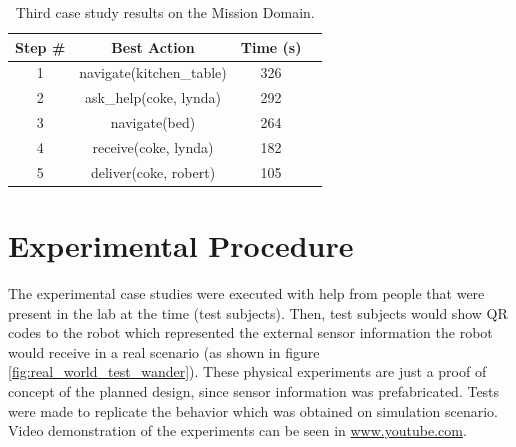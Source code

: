 \begin{table}[H]
\centering
\begin{tabular}{ |c|c|c|c| }
 \hline
Step \# & Best Action                                          &  Time (s) \\
 \hline
1       & navigate(kitchen\_table)                              & 326               \\
2       & ask\_help(coke, lynda)                                & 292               \\
3       & navigate(bed)                                         & 264               \\
4       & receive(coke, lynda)                                  & 182               \\
5       & deliver(coke, robert)                                 & 105               \\
\hline
\end{tabular}
\label{tab:results_three}
\caption{Third case study results on the Mission Domain.}
\end{table}

\section{Experimental Procedure}

The experimental case studies were executed with help from people that were present
in the lab at the time (test subjects). Then, test subjects would show QR codes to 
the robot which represented the external sensor information the robot would receive in 
a real scenario (as shown in figure \ref{fig:real_world_test_wander}). These physical 
experiments are just a proof of concept of the planned design, since sensor information was prefabricated.
Tests were made to replicate the behavior which was obtained on simulation scenario.
Video demonstration of the experiments can be seen in \url{www.youtube.com}.

